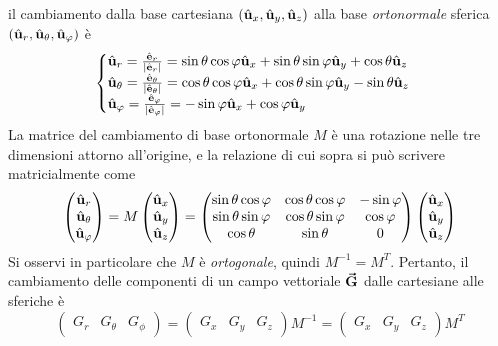 il cambiamento dalla base cartesiana $\left(\hat{\mathbf{u}}_x,\hat{\mathbf{u}}_y,\hat{\mathbf{u}}_z\right)$ alla base \textit{ortonormale} sferica $\left(\hat{\mathbf{u}}_r,\hat{\mathbf{u}}_\theta,\hat{\mathbf{u}}_\varphi\right)$ è
\begin{equation}
	\begin{cases}
		\hat{\mathbf{u}}_r=\frac{\hat{\mathbf{e}}_r}{\abs{\hat{\mathbf{e}}_r}}=\sin\theta\cos\varphi\hat{\mathbf{u}}_x+\sin\theta\sin\varphi\hat{\mathbf{u}}_y+\cos\theta\hat{\mathbf{u}}_z\\
		\hat{\mathbf{u}}_\theta=\frac{\hat{\mathbf{e}}_\theta}{\abs{\hat{\mathbf{e}}_\theta}}=\cos\theta\cos\varphi\hat{\mathbf{u}}_x+\cos\theta\sin\varphi\hat{\mathbf{u}}_y-\sin\theta\hat{\mathbf{u}}_z\\
		\hat{\mathbf{u}}_\varphi=\frac{\hat{\mathbf{e}}_\varphi}{\abs{\hat{\mathbf{e}}_\varphi}}=-\sin\varphi\hat{\mathbf{u}}_x+\cos\varphi\hat{\mathbf{u}}_y
	\end{cases}
\end{equation}
La matrice del cambiamento di base ortonormale $M$ è una rotazione nelle tre dimensioni attorno all'origine, e la relazione di cui sopra si può scrivere matricialmente come
\begin{equation}
	\begin{pmatrix}
		\hat{\mathbf{u}}_r\\
		\hat{\mathbf{u}}_\theta\\
		\hat{\mathbf{u}}_\varphi
	\end{pmatrix}=M\begin{pmatrix}
		\hat{\mathbf{u}}_x\\
		\hat{\mathbf{u}}_y\\
		\hat{\mathbf{u}}_z
	\end{pmatrix}=
	\begin{pmatrix}
		\sin\theta\cos\varphi & \cos\theta\cos\varphi & -\sin\varphi\\
		\sin\theta\sin\varphi & \cos\theta\sin\varphi & \cos\varphi\\
		\cos\theta & \sin\theta & 0
	\end{pmatrix}
	\begin{pmatrix}
		\hat{\mathbf{u}}_x\\
		\hat{\mathbf{u}}_y\\
		\hat{\mathbf{u}}_z
	\end{pmatrix}
\end{equation}
Si osservi in particolare che $M$ è \textit{ortogonale}, quindi $M^{-1}=M^{T}$.
Pertanto, il cambiamento delle componenti di un campo vettoriale $\vb*{\va{G}}$ dalle cartesiane alle sferiche è
\begin{equation}
	\begin{pmatrix}
		G_r & G_\theta & G_\phi
	\end{pmatrix}=
	\begin{pmatrix}
		G_x & G_y & G_z
	\end{pmatrix}M^{-1}=
	\begin{pmatrix}
		G_x & G_y & G_z
	\end{pmatrix}M^T
\end{equation}
